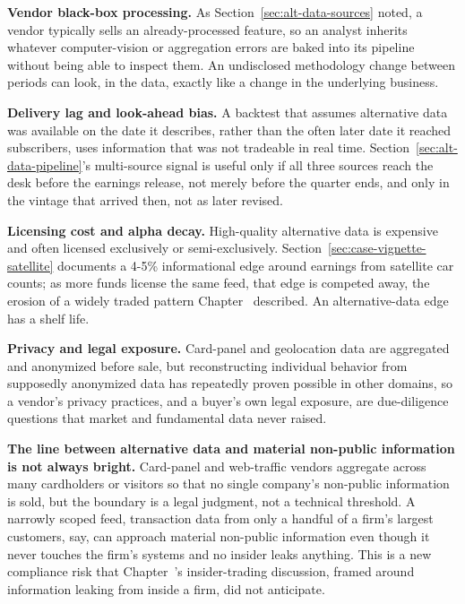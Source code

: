 \documentclass[../ai_in_finance]{subfiles}
\begin{document}
\textbf{Vendor black-box processing.} As Section~\ref{sec:alt-data-sources} noted, a vendor typically sells an already-processed feature, so an analyst inherits whatever computer-vision or aggregation errors are baked into its pipeline without being able to inspect them. An undisclosed methodology change between periods can look, in the data, exactly like a change in the underlying business.

\textbf{Delivery lag and look-ahead bias.} A backtest that assumes alternative data was available on the date it describes, rather than the often later date it reached subscribers, uses information that was not tradeable in real time. Section~\ref{sec:alt-data-pipeline}'s multi-source signal is useful only if all three sources reach the desk before the earnings release, not merely before the quarter ends, and only in the vintage that arrived then, not as later revised.

\textbf{Licensing cost and alpha decay.} High-quality alternative data is expensive and often licensed exclusively or semi-exclusively. Section~\ref{sec:case-vignette-satellite} documents a 4-5\% informational edge around earnings from satellite car counts; as more funds license the same feed, that edge is competed away, the erosion of a widely traded pattern Chapter~ described. An alternative-data edge has a shelf life.

\textbf{Privacy and legal exposure.} Card-panel and geolocation data are aggregated and anonymized before sale, but reconstructing individual behavior from supposedly anonymized data has repeatedly proven possible in other domains, so a vendor's privacy practices, and a buyer's own legal exposure, are due-diligence questions that market and fundamental data never raised.

\textbf{The line between alternative data and material non-public information is not always bright.} Card-panel and web-traffic vendors aggregate across many cardholders or visitors so that no single company's non-public information is sold, but the boundary is a legal judgment, not a technical threshold. A narrowly scoped feed, transaction data from only a handful of a firm's largest customers, say, can approach material non-public information even though it never touches the firm's systems and no insider leaks anything. This is a new compliance risk that Chapter~'s insider-trading discussion, framed around information leaking from inside a firm, did not anticipate.
\end{document}
